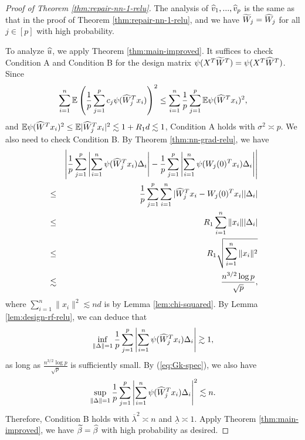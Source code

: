 \begin{proof}[Proof of Theorem \ref{thm:repair-nn-1-relu}]
The analysis of $\widehat{v}_1,...,\widehat{v}_p$ is the same as that in the proof of Theorem \ref{thm:repair-nn-1-relu}, and we have $\widetilde{W}_j=\widehat{W}_j$ for all $j\in[p]$ with high probability.

To analyze $\widehat{u}$, we apply Theorem \ref{thm:main-improved}. It suffices to check Condition A and Condition B for the design matrix $\psi(X^T\widetilde{W}^T)=\psi(X^T\widehat{W}^T)$. Since
$$\sum_{i=1}^n\mathbb{E}\left(\frac{1}{p}\sum_{j=1}^pc_j\psi(\widehat{W}_j^Tx_i)\right)^2\leq \sum_{i=1}^n\frac{1}{p}\sum_{j=1}^p\mathbb{E}\psi(\widehat{W}^Tx_i)^2,$$
and $\mathbb{E}\psi(\widehat{W}^Tx_i)^2\leq \mathbb{E}|\widehat{W}_j^Tx_i|^2\lesssim 1 + R_1d\lesssim 1$, Condition A holds with $\sigma^2\asymp p$.
We also need to check Condition B. By Theorem \ref{thm:nn-grad-relu}, we have
\begin{eqnarray*}
&& \left|\frac{1}{p}\sum_{j=1}^p\left|\sum_{i=1}^n\psi(\wh{W}_j^Tx_i)\Delta_i\right| - \frac{1}{p}\sum_{j=1}^p\left|\sum_{i=1}^n\psi(W_j(0)^Tx_i)\Delta_i\right|\right| \\
&\leq& \frac{1}{p}\sum_{j=1}^p\sum_{i=1}^n|\wh{W}_j^Tx_i-W_j(0)^Tx_i||\Delta_i| \\
&\leq& R_1\sum_{i=1}^n\|x_i\||\Delta_i| \\
&\leq& R_1\sqrt{\sum_{i=1}^n\|x_i\|^2} \\
&\lesssim& \frac{n^{3/2}\log p}{\sqrt{p}},
\end{eqnarray*}
where $\sum_{i=1}^n\|x_i\|^2\lesssim nd$ is by Lemma \ref{lem:chi-squared}. By Lemma \ref{lem:design-rf-relu}, we can deduce that
$$\inf_{\|\Delta\|=1}\frac{1}{p}\sum_{j=1}^p\left|\sum_{i=1}^n\psi(\widehat{W}_j^Tx_i)\Delta_i\right|\gtrsim 1,$$
as long as $\frac{n^{3/2}\log p}{\sqrt{p}}$ is sufficiently small. By (\ref{eq:Gk-spec}), we also have
$$\sup_{\|\Delta\|=1}\frac{1}{p}\sum_{j=1}^p\left|\sum_{i=1}^n\psi(\widehat{W}_j^Tx_i)\Delta_i\right|^2\lesssim n.$$
Therefore, Condition B holds with $\overline{\lambda}^2\asymp n$ and $\underline{\lambda}\asymp 1$. Apply Theorem \ref{thm:main-improved}, we have $\widetilde{\beta}=\widehat{\beta}$ with high probability as desired.
\end{proof}





